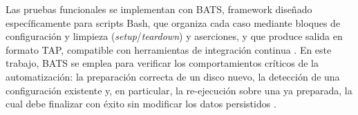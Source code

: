 Las pruebas funcionales se implementan con BATS, framework diseñado específicamente para scripts Bash, que organiza cada caso mediante bloques de configuración y limpieza (\textit{setup}/\textit{teardown}) y aserciones, y que produce salida en formato TAP, compatible con herramientas de integración continua \parencite{bats_testing}. En este trabajo, BATS se emplea para verificar los comportamientos críticos de la automatización: la preparación correcta de un disco nuevo, la detección de una configuración existente y, en particular, la re-ejecución sobre una \vm{} ya preparada, la cual debe finalizar con éxito sin modificar los datos persistidos \parencite{idempotency_concept}.
